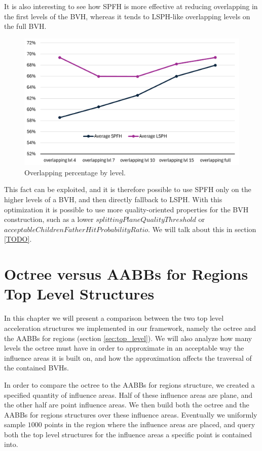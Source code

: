 \documentclass{PoliMi_MasterThesis}
\begin{document}
It is also interesting to see how SPFH is more effective at reducing overlapping in the first levels of the BVH, whereas it tends to LSPH-like overlapping levels on the full BVH.

\begin{figure}[H] 
	\centering
	\includegraphics[width=\textwidth]{Images/overlapping_percentage_by_level.png}
	\caption{Overlapping percentage by level.}
	\label{fig:overlapping_percentage_by_level}
\end{figure}

This fact can be exploited, and it is therefore possible to use SPFH only on the higher levels of a BVH, and then directly fallback to LSPH. With this optimization it is possible to use more quality-oriented properties for the BVH construction, such as a lower $splittingPlaneQualityThreshold$ or $acceptableChildrenFatherHitProbabilityRatio$. We will talk about this in section \ref{TODO}.

\section{Octree versus AABBs for Regions Top Level Structures} \label{sec:octree_vs_aabbs}
In this chapter we will present a comparison between the two top level acceleration structures we implemented in our framework, namely the octree and the AABBs for regions (section \ref{sec:top_level}). We will also analyze how many levels the octree must have in order to approximate in an acceptable way the influence areas it is built on, and how the approximation affects the traversal of the contained BVHs.

In order to compare the octree to the AABBs for regions structure, we created a specified quantity of influence areas. Half of these influence areas are plane, and the other half are point influence areas. We then build both the octree and the AABBs for regions structures over these influence areas. Eventually we uniformly sample $1000$ points in the region where the influence areas are placed, and query both the top level structures for the influence areas a specific point is contained into.
\end{document}
